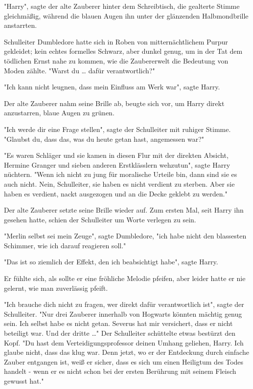{"Harry", sagte der alte Zauberer hinter dem Schreibtisch, die gealterte Stimme gleichmäßig, während die blauen Augen ihn unter der glänzenden Halbmondbrille anstarrten.

Schulleiter Dumbledore hatte sich in Roben von mitternächtlichem Purpur gekleidet; kein echtes formelles Schwarz, aber dunkel genug, um in der Tat dem tödlichen Ernst nahe zu kommen, wie die Zaubererwelt die Bedeutung von Moden zählte. "Warst du … dafür verantwortlich?"

"Ich kann nicht leugnen, dass mein Einfluss am Werk war", sagte Harry.

Der alte Zauberer nahm seine Brille ab, beugte sich vor, um Harry direkt anzustarren, blaue Augen zu grünen.

"Ich werde dir eine Frage stellen", sagte der Schulleiter mit ruhiger Stimme. "Glaubst du, dass das, was du heute getan hast, angemessen war?"

"Es waren Schläger und sie kamen in diesen Flur mit der direkten Absicht, Hermine Granger und sieben anderen Erstklässlern wehzutun", sagte Harry nüchtern. "Wenn ich nicht zu jung für moralische Urteile bin, dann sind sie es auch nicht. Nein, Schulleiter, sie haben es nicht verdient zu sterben. Aber sie haben es verdient, nackt ausgezogen und an die Decke geklebt zu werden."

Der alte Zauberer setzte seine Brille wieder auf. Zum ersten Mal, seit Harry ihn gesehen hatte, schien der Schulleiter um Worte verlegen zu sein.

"Merlin selbst sei mein Zeuge", sagte Dumbledore, "ich habe nicht den blassesten Schimmer, wie ich darauf reagieren soll."

"Das ist so ziemlich der Effekt, den ich beabsichtigt habe", sagte Harry.

Er fühlte sich, als sollte er eine fröhliche Melodie pfeifen, aber leider hatte er nie gelernt, wie man zuverlässig pfeift.

"Ich brauche dich nicht zu fragen, wer direkt dafür verantwortlich ist", sagte der Schulleiter. "Nur drei Zauberer innerhalb von Hogwarts könnten mächtig genug sein. Ich selbst habe es nicht getan. Severus hat mir versichert, dass er nicht beteiligt war. Und der dritte …" Der Schulleiter schüttelte etwas bestürzt den Kopf. "Du hast dem Verteidigungsprofessor deinen Umhang geliehen, Harry. Ich glaube nicht, dass das klug war. Denn jetzt, wo er der Entdeckung durch einfache Zauber entgangen ist, weiß er sicher, dass es sich um einen Heiligtum des Todes handelt - wenn er es nicht schon bei der ersten Berührung mit seinem Fleisch gewusst hat."

}
